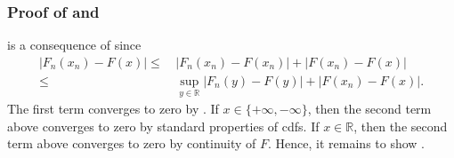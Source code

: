 \subsubsection{Proof of \texorpdfstring{}{Theorem
\ref{thm--polya}} and \texorpdfstring{}{Corollary
\ref{cor--polya}}}
\label{sec--prf--thm--cor--polya}

 is a consequence of  since
\begin{align*}
  \left| F_{n} \left( x_{n} \right) - F (x) \right| \leq & \, \left| F_{n}
  \left( x_{n} \right) - F \left( x_{n} \right) \right| + \left| F \left( x_{n}
  \right) - F (x) \right| \\
  \leq
  & \, \sup_{y \in \mathbb{R}} \left| F_{n} (y) - F (y) \right| + \left| F
  \left( x_{n} \right) - F (x) \right|.
\end{align*}
The first term converges to zero by .
If \(x \in \{+ \infty, - \infty\}\), then the second term above converges to
zero by standard properties of cdfs.
If \(x \in \mathbb{R}\), then the second term above converges to zero by
continuity of \(F\).
Hence, it remains to show .

